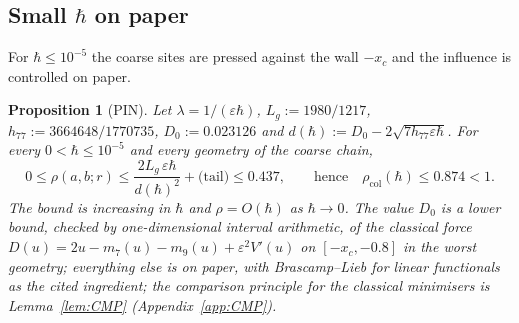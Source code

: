 \documentclass[11pt,a4paper]{article}
\newtheorem{proposition}[theorem]{Proposition}
\theoremstyle{definition}
\theoremstyle{remark}
\newcommand{\xc}{x_c}
\newcommand{\rcol}{\rho_{\mathrm{col}}}
\begin{document}
\subsection{Small \texorpdfstring{$\hbar$}{hbar} on paper}\label{sec:PIN}
For $\hbar\le10^{-5}$ the coarse sites are pressed against the wall $-\xc$ and the influence is controlled on paper.

\begin{proposition}[PIN]\label{prop:PIN}
Let $\lambda=1/(\varepsilon\hbar)$, $L_g:=1980/1217$, $h_{77}:=3664648/1770735$, $D_0:=0.023126$ and $d(\hbar):=D_0-2\sqrt{7h_{77}\varepsilon\hbar}$. For every $0<\hbar\le10^{-5}$ and every geometry of the coarse chain,
\[
0\le\rho(a,b;r)\le\frac{2L_g\,\varepsilon\hbar}{d(\hbar)^2}+\text{(tail)}\le0.437,\qquad\text{hence}\quad\rcol(\hbar)\le0.874<1 .
\]
The bound is increasing in $\hbar$ and $\rho=O(\hbar)$ as $\hbar\to0$. The value $D_0$ is a lower bound, checked by one-dimensional interval arithmetic, of the classical force $D(u)=2u-m_7(u)-m_9(u)+\varepsilon^2V'(u)$ on $[-\xc,-0.8]$ in the worst geometry; everything else is on paper, with Brascamp--Lieb for linear functionals as the cited ingredient; the comparison principle for the classical minimisers is Lemma~\ref{lem:CMP} (Appendix~\ref{app:CMP}).
\end{proposition}
\end{document}
